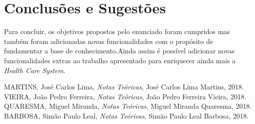 \documentclass{article}
\begin{document}
\newpage

\vspace*{\fill}
\section{Conclusões e Sugestões}
Para concluir, os objetivos propostos pelo enunciado foram cumpridos mas também foram adicionadas novas funcionalidades com o propósito de fundamentar a base de conhecimento.Ainda assim é possível adicionar novas funcionalidades extras ao trabalho apresentado para enriquecer ainda mais a \textit{Health Care System}.
\vspace*{\fill}

\newpage

\begin{thebibliography}{10}
    MARTINS, José Carlos Lima,
    \textit{Notas Teóricas},
    José Carlos Lima Martins, 
    2018.
    VIEIRA, João Pedro Ferreira,
    \textit{Notas Teóricas},
    João Pedro Ferreira Vieira, 
    2018.
    QUARESMA, Miguel Miranda,
    \textit{Notas Teóricas},
    Miguel Miranda Quaresma, 
    2018.
    BARBOSA, Simão Paulo Leal,
    \textit{Notas Teóricas},
    Simão Paulo Leal Barbosa, 
    2018. 
\end{thebibliography}
\end{document}
